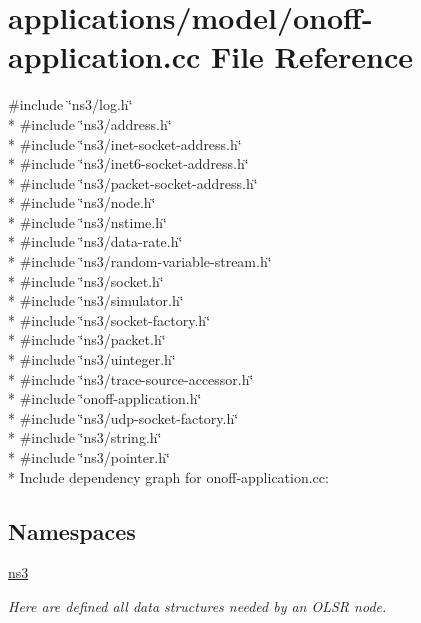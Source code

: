 \hypertarget{onoff-application_8cc}{}\section{applications/model/onoff-\/application.cc File Reference}
\label{onoff-application_8cc}
{\ttfamily \#include \char`\"{}ns3/log.\+h\char`\"{}}\\*
{\ttfamily \#include \char`\"{}ns3/address.\+h\char`\"{}}\\*
{\ttfamily \#include \char`\"{}ns3/inet-\/socket-\/address.\+h\char`\"{}}\\*
{\ttfamily \#include \char`\"{}ns3/inet6-\/socket-\/address.\+h\char`\"{}}\\*
{\ttfamily \#include \char`\"{}ns3/packet-\/socket-\/address.\+h\char`\"{}}\\*
{\ttfamily \#include \char`\"{}ns3/node.\+h\char`\"{}}\\*
{\ttfamily \#include \char`\"{}ns3/nstime.\+h\char`\"{}}\\*
{\ttfamily \#include \char`\"{}ns3/data-\/rate.\+h\char`\"{}}\\*
{\ttfamily \#include \char`\"{}ns3/random-\/variable-\/stream.\+h\char`\"{}}\\*
{\ttfamily \#include \char`\"{}ns3/socket.\+h\char`\"{}}\\*
{\ttfamily \#include \char`\"{}ns3/simulator.\+h\char`\"{}}\\*
{\ttfamily \#include \char`\"{}ns3/socket-\/factory.\+h\char`\"{}}\\*
{\ttfamily \#include \char`\"{}ns3/packet.\+h\char`\"{}}\\*
{\ttfamily \#include \char`\"{}ns3/uinteger.\+h\char`\"{}}\\*
{\ttfamily \#include \char`\"{}ns3/trace-\/source-\/accessor.\+h\char`\"{}}\\*
{\ttfamily \#include \char`\"{}onoff-\/application.\+h\char`\"{}}\\*
{\ttfamily \#include \char`\"{}ns3/udp-\/socket-\/factory.\+h\char`\"{}}\\*
{\ttfamily \#include \char`\"{}ns3/string.\+h\char`\"{}}\\*
{\ttfamily \#include \char`\"{}ns3/pointer.\+h\char`\"{}}\\*
Include dependency graph for onoff-\/application.cc\+:
\subsection*{Namespaces}
\begin{DoxyCompactItemize}
\item 
 \hyperlink{namespacens3}{ns3}
\begin{DoxyCompactList}\small\item\em Here are defined all data structures needed by an O\+L\+SR node. \end{DoxyCompactList}\end{DoxyCompactItemize}
